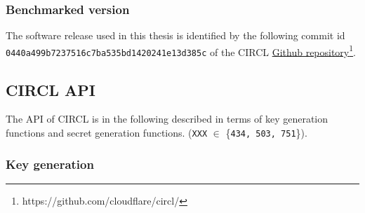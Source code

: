 \subsubsection{Benchmarked version}
The software release used in this thesis is identified by the following commit id \\ \texttt{0440a499b7237516c7ba535bd1420241e13d385c} of the \gls{CIRCL} \href{https://github.com/cloudflare/circl/}{Github repository}\footnote{https://github.com/cloudflare/circl/}.

\subsection{\gls{CIRCL} API}
The API of \gls{CIRCL} is in the following described in terms of key generation functions and secret generation functions. (\texttt{XXX} $\in$ \{\texttt{434, 503, 751}\}).

\subsubsection{Key generation}

